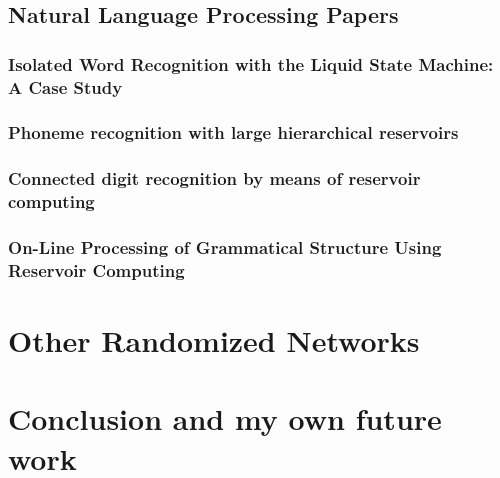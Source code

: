 \documentclass[12pt,oneside]{CUNY_CS_PhD}
\begin{document}
\section{Natural Language Processing Papers}
\subsection{Isolated Word Recognition with the Liquid State Machine: A Case Study \cite{verstraeten_isolated_2005}}

\subsection{Phoneme recognition with large hierarchical reservoirs \cite{triefenbach_phoneme_2010}}

\subsection{Connected digit recognition by means of reservoir computing \cite{jalalvand_connected_2011}}

\subsection{On-Line Processing of Grammatical Structure Using Reservoir Computing \cite{hinaut_-line_2012}}


\chapter{Other Randomized Networks}

\chapter{Conclusion and my own future work}

\backmatter



\end{document}

